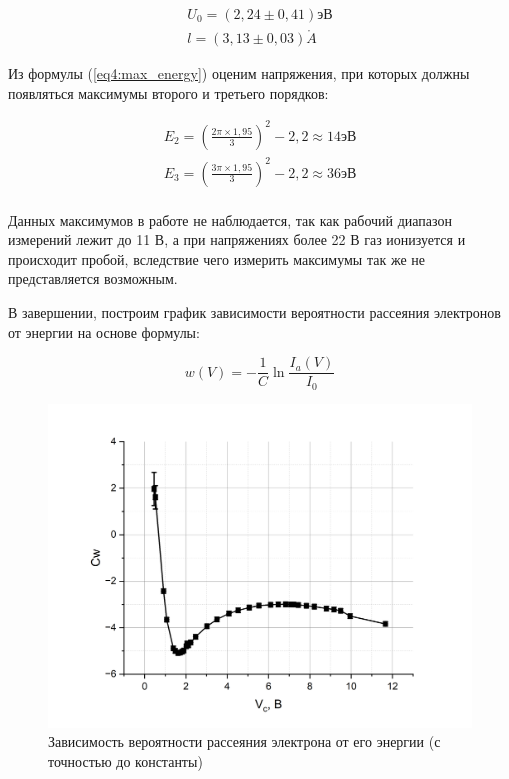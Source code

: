 \documentclass[a4paper,12pt]{article}
\begin{document}
\begin{align*}
	U_0 = (2,24 \pm 0,41) эВ \\
	l = (3,13 \pm 0,03) \mathring{A}
\end{align*}

Из формулы (\ref{eq4:max_energy}) оценим напряжения, при которых должны появляться максимумы второго и третьего порядков:

\begin{align*}
	E_2 = \left(\frac{2\pi \times 1,95}{3}\right)^2 - 2,2 \approx 14 эВ \\ 
	E_3 = \left(\frac{3\pi \times 1,95}{3}\right)^2 - 2,2 \approx 36 эВ \\
\end{align*}

Данных максимумов в работе не наблюдается, так как рабочий диапазон измерений лежит до 11 В, а при напряжениях более 22 В газ ионизуется и происходит пробой, вследствие чего измерить максимумы так же не представляется возможным.

В завершении, построим график зависимости вероятности рассеяния электронов от энергии на основе формулы:

$$
	w(V) = -\frac{1}{C} \ln \frac{I_a(V)}{I_0}
$$

\newpage

\begin{figure}[h]
	\includegraphics[width=\linewidth]{graph3}
	\caption{Зависимость вероятности рассеяния электрона от его энергии (с точностью до константы)}
	\label{graph3:Probability}
\end{figure}
\end{document}
